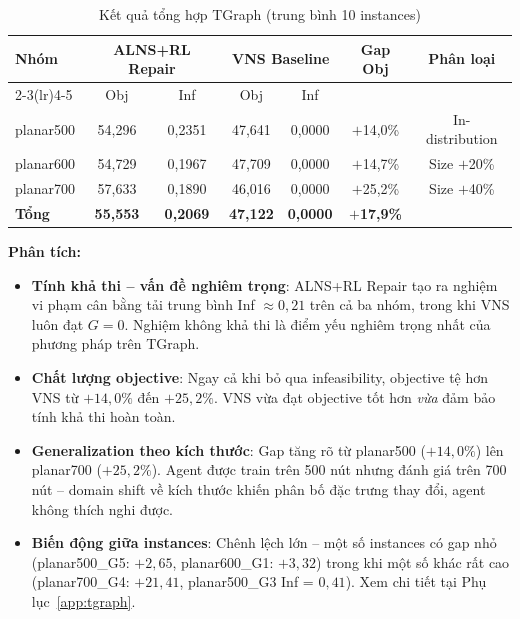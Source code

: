 \documentclass[12pt, a4paper]{article}
\begin{document}
\begin{table}[H]
  \centering
  \caption{Kết quả tổng hợp TGraph (trung bình 10 instances)}
  \begin{tabular}{lcccccc}
    \toprule
    \multirow{2}{*}{Nhóm} &
    \multicolumn{2}{c}{ALNS+RL Repair} &
    \multicolumn{2}{c}{VNS Baseline} &
    \multirow{2}{*}{Gap Obj} &
    \multirow{2}{*}{Phân loại} \\
    \cmidrule(lr){2-3}\cmidrule(lr){4-5}
    & Obj & Inf & Obj & Inf & & \\
    \midrule
    planar500 & 54{,}296 & 0{,}2351 & 47{,}641 & 0{,}0000 & $+$14{,}0\% & In-distribution \\
    planar600 & 54{,}729 & 0{,}1967 & 47{,}709 & 0{,}0000 & $+$14{,}7\% & Size $+$20\% \\
    planar700 & 57{,}633 & 0{,}1890 & 46{,}016 & 0{,}0000 & $+$25{,}2\% & Size $+$40\% \\
    \midrule
    \textbf{Tổng} & \textbf{55{,}553} & \textbf{0{,}2069} & \textbf{47{,}122} &
    \textbf{0{,}0000} & \textbf{$+$17{,}9\%} & \\
    \bottomrule
  \end{tabular}
\end{table}

\textbf{Phân tích:}
\begin{itemize}
  \item \textbf{Tính khả thi -- vấn đề nghiêm trọng}: ALNS+RL Repair tạo ra nghiệm
        vi phạm cân bằng tải trung bình Inf $\approx 0{,}21$ trên cả ba nhóm,
        trong khi VNS luôn đạt $G = 0$. Nghiệm không khả thi là điểm yếu
        nghiêm trọng nhất của phương pháp trên TGraph.

  \item \textbf{Chất lượng objective}: Ngay cả khi bỏ qua infeasibility,
        objective tệ hơn VNS từ $+14{,}0\%$ đến $+25{,}2\%$. VNS vừa đạt
        objective tốt hơn \emph{vừa} đảm bảo tính khả thi hoàn toàn.

  \item \textbf{Generalization theo kích thước}: Gap tăng rõ từ planar500
        ($+14{,}0\%$) lên planar700 ($+25{,}2\%$). Agent được train trên 500
        nút nhưng đánh giá trên 700 nút -- domain shift về kích thước khiến
        phân bố đặc trưng thay đổi, agent không thích nghi được.

  \item \textbf{Biến động giữa instances}: Chênh lệch lớn -- một số instances
        có gap nhỏ (planar500\_G5: $+2{,}65$, planar600\_G1: $+3{,}32$) trong
        khi một số khác rất cao (planar700\_G4: $+21{,}41$, planar500\_G3
        Inf = $0{,}41$). Xem chi tiết tại Phụ lục~\ref{app:tgraph}.
\end{itemize}
\end{document}
